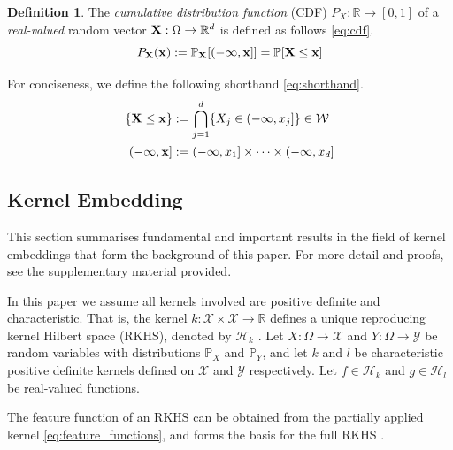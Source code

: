 \documentclass[twoside]{article} \usepackage{aistats2017}
\theoremstyle{definition}
\newtheorem{definition}{Definition}[section]
\theoremstyle{theorem}
\newcommand{\rv}[1]{{#1}}
\newcommand{\Hk}{\mathcal{H}_{k}}
\newcommand{\Hl}{\mathcal{H}_{l}}
\begin{document}
	\begin{definition} \label{def:cdf}
		\citep{bauer1981probability}
		The \textit{cumulative distribution function} (CDF) $P_{\rv{X}} : \mathbb{R} \to [0, 1]$ of a \textit{real-valued} random vector $\bvec{\rv{X}} : \Omega \to \mathbb{R}^{d}$ is defined as follows \eqref{eq:cdf}.
		\begin{equation}
				P_{\bvec{\rv{X}}}(\bvec{x}) := \mathbb{P}_{\bvec{\rv{X}}}[(-\bvec{\infty}, \bvec{x}]] = \mathbb{P}[\bvec{\rv{X}} \leq \bvec{x}]
		\label{eq:cdf}
		\end{equation}

		For conciseness, we define the following shorthand \eqref{eq:shorthand}. 
		\begin{equation}
			\begin{aligned}
				\{\bvec{\rv{X}} \leq \bvec{x}\} &:= \bigcap\limits_{j = 1}^{d} \{\rv{X}_{j} \in (-\infty, x_{j}]\} \in \mathcal{W} \\
				(-\bvec{\infty}, \bvec{x}] &:= (-\infty, x_{1}] \times \dots \times (-\infty, x_{d}] \\
			\end{aligned}
		\label{eq:shorthand}
		\end{equation}
	\end{definition}
		
	\subsection{Kernel Embedding}
	\label{sec:background:kernel_embedding}
	
		This section summarises fundamental and important results in the field of kernel embeddings that form the background of this paper. For more detail and proofs, see the supplementary material provided.

		In this paper we assume all kernels involved are positive definite and characteristic. That is, the kernel $k : \mathcal{X} \times \mathcal{X} \to \mathbb{R}$ defines a unique reproducing kernel Hilbert space (RKHS), denoted by $\mathcal{H}_{k}$ \citep{fukumizu2004dimensionality}. Let $\rv{X} : \Omega \to \mathcal{X}$ and $\rv{Y} : \Omega \to \mathcal{Y}$ be random variables with distributions $\mathbb{P}_{\rv{X}}$ and $\mathbb{P}_{\rv{Y}}$, and let $k$ and $l$ be characteristic positive definite kernels defined on $\mathcal{X}$ and $\mathcal{Y}$ respectively. Let $f \in \Hk$ and $g \in \Hl$ be real-valued functions.
		
		The feature function of an RKHS can be obtained from the partially applied kernel \eqref{eq:feature_functions}, and forms the basis for the full RKHS \citep{muandet2016kernel}.
			
\end{document}
